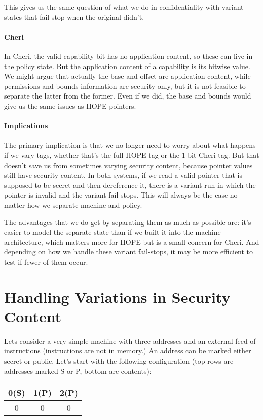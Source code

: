 \documentclass{article}
\begin{document}
This gives us the same question of what we do in confidentiality with variant states that fail-stop
when the original didn't.

\paragraph*{Cheri} In Cheri, the valid-capability bit has no application content, so these can live in
the policy state. But the application content of a capability is its bitwise value. We might argue
that actually the base and offset are application content, while permissions and bounds information
are security-only, but it is not feasible to separate the latter from the former. Even if we did, the
base and bounds would give us the same issues as HOPE pointers.

\paragraph*{Implications} The primary implication is that we no longer need to worry about what happens
if we vary tags, whether that's the full HOPE tag or the 1-bit Cheri tag. But that doesn't save us
from sometimes varying security content, because pointer values still have security content. In both systems,
if we read a valid pointer that is supposed to be secret and then dereference it, there is a variant run
in which the pointer is invalid and the variant fail-stops. This will always be the case no matter how we
separate machine and policy.

The advantages that we do get by separating them as much as possible are: it's easier to model the separate
state than if we built it into the machine architecture, which matters more for HOPE but is a small concern for
Cheri. And depending on how we handle these variant fail-stops, it may be more efficient to test if fewer of
them occur.

\section{Handling Variations in Security Content}

Lets consider a very simple machine with three addresses and an external feed of instructions
(instructions are not in memory.) An address can be marked either secret or public. Let's start with
the following configuration (top rows are addresses marked S or P, bottom are contents):

\begin{tabular}{| c | c | c |}
  \hline
  0(S) & 1(P) & 2(P) \\
  \hline
  0 & 0 & 0 \\
  \hline
\end{tabular}
\end{document}
